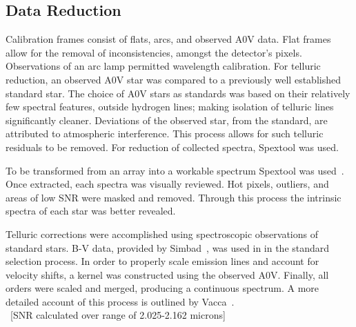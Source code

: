 \subsection{Data Reduction}


Calibration frames consist of flats, arcs, and observed A0V data.  Flat frames allow for the removal of inconsistencies, amongst the detector's pixels.  Observations of an arc lamp permitted wavelength calibration.  For telluric reduction, an observed A0V star was compared to a previously well established standard star.  The choice of A0V stars as standards was based on their relatively few spectral features, outside hydrogen lines; making isolation of telluric lines significantly cleaner.  
Deviations of the observed star, from the standard, are attributed to atmospheric interference.  This process allows for such telluric residuals to be removed.  For reduction of collected spectra, Spextool was used.





To be transformed from an array into a workable spectrum Spextool was used~\cite{Cushing_2004}.  Once extracted, each spectra was visually reviewed.  Hot pixels, outliers, and areas of low SNR were masked and removed.  Through this process the intrinsic spectra of each star was better revealed.


Telluric corrections were accomplished using spectroscopic observations of standard stars. B-V data, provided by Simbad~\cite{simbad}, was used in in the standard selection process.
In order to properly scale emission lines and account for velocity shifts, a kernel was constructed using the observed A0V.  Finally, all orders were scaled and merged, producing a continuous spectrum.
A more detailed account of this process is outlined by Vacca~\cite{Vacca_2003}.\\



~[SNR calculated over range of 2.025-2.162 microns]\\